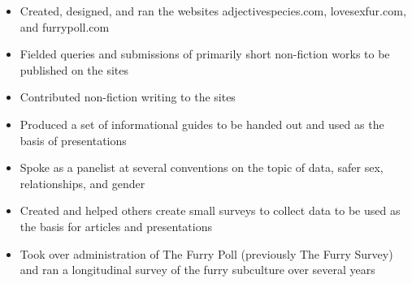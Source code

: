 \begin{description}
\begin{itemize}
\tightlist
\item
  Created, designed, and ran the websites adjectivespecies.com,
  lovesexfur.com, and furrypoll.com
\item
  Fielded queries and submissions of primarily short non-fiction works
  to be published on the sites
\item
  Contributed non-fiction writing to the sites
\item
  Produced a set of informational guides to be handed out and used as
  the basis of presentations
\item
  Spoke as a panelist at several conventions on the topic of data, safer
  sex, relationships, and gender
\item
  Created and helped others create small surveys to collect data to be
  used as the basis for articles and presentations
\item
  Took over administration of The Furry Poll (previously The Furry
  Survey) and ran a longitudinal survey of the furry subculture over
  several years
\end{itemize}
\end{description}
